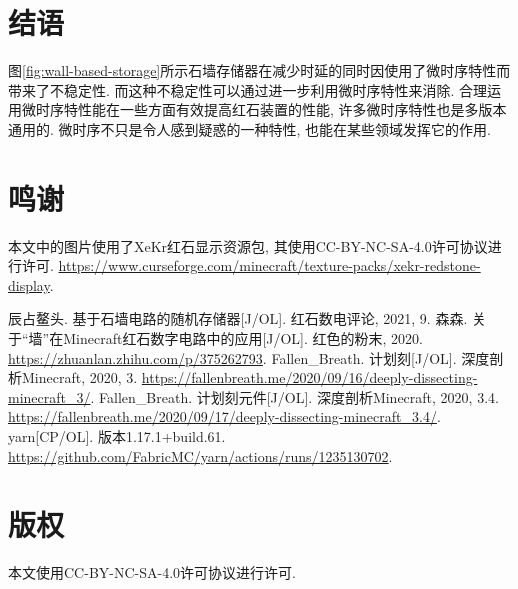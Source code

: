 \documentclass{article}
\begin{document}
    \section{结语}
    图\ref{fig:wall-based-storage}所示石墙存储器在减少时延的同时因使用了微时序特性而带来了不稳定性. 而这种不稳定性可以通过进一步利用微时序特性来消除. 合理运用微时序特性能在一些方面有效提高红石装置的性能, 许多微时序特性也是多版本通用的. 微时序不只是令人感到疑惑的一种特性, 也能在某些领域发挥它的作用.

    \section*{鸣谢}
    本文中的图片使用了XeKr红石显示资源包, 其使用CC-BY-NC-SA-4.0许可协议进行许可. \url{https://www.curseforge.com/minecraft/texture-packs/xekr-redstone-display}.
    
    \begin{thebibliography}{99}
        辰占鳌头. 基于石墙电路的随机存储器[J/OL]. 红石数电评论, 2021, 9.
        森森. 关于“墙”在Minecraft红石数字电路中的应用[J/OL]. 红色的粉末, 2020. \url{https://zhuanlan.zhihu.com/p/375262793}.
        Fallen\_Breath. 计划刻[J/OL]. 深度剖析Minecraft, 2020, 3. \url{https://fallenbreath.me/2020/09/16/deeply-dissecting-minecraft_3/}.
        Fallen\_Breath. 计划刻元件[J/OL]. 深度剖析Minecraft, 2020, 3.4. \url{https://fallenbreath.me/2020/09/17/deeply-dissecting-minecraft_3.4/}.
        yarn[CP/OL]. 版本1.17.1+build.61. \url{https://github.com/FabricMC/yarn/actions/runs/1235130702}.
    \end{thebibliography}

    \section*{版权}
    本文使用CC-BY-NC-SA-4.0许可协议进行许可.
\end{document}

